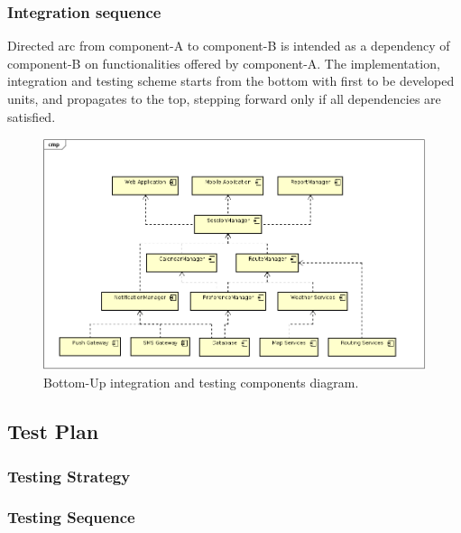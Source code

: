 \subsubsection{Integration sequence}

Directed arc from component-A to component-B is intended as a dependency of component-B on functionalities offered by component-A.
The implementation, integration and testing scheme starts from the bottom with first to be developed units, and propagates to the top, stepping forward only if all dependencies are satisfied.

\begin{figure}
	\centering
	\includegraphics{Images/IntegrationDiagram.png}
	\caption{\label{fig:integration} Bottom-Up integration and testing components diagram. }
\end{figure}

\clearpage %

\subsection{Test Plan}
\label{testplan}


\subsubsection{Testing Strategy}
\subsubsection{Testing Sequence}